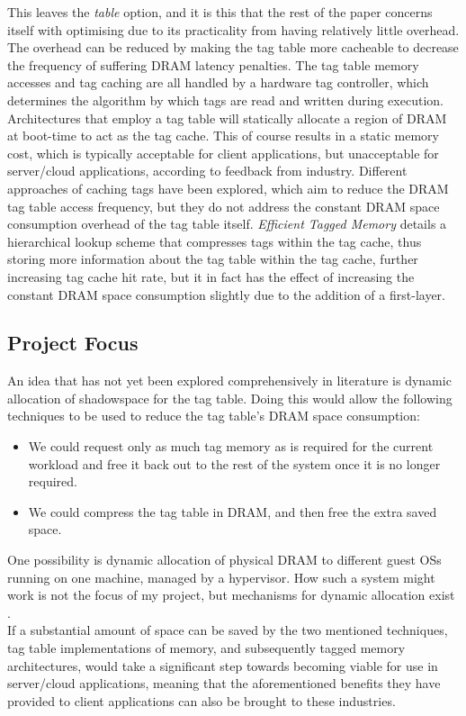 \documentclass[10pt,a4paper]{article}
\begin{document}
This leaves the \textit{table} option, and it is this that the rest of the paper concerns itself with optimising due to its practicality from having relatively little overhead. The overhead can be reduced by making the tag table more cacheable to decrease the frequency of suffering DRAM latency penalties. The tag table memory accesses and tag caching are all handled by a hardware tag controller, which determines the algorithm by which tags are read and written during execution.\\
Architectures that employ a tag table will statically allocate a region of DRAM at boot-time to act as the tag cache. This of course results in a static memory cost, which is typically acceptable for client applications, but unacceptable for server/cloud applications, according to feedback from industry. Different approaches of caching tags have been explored, which aim to reduce the DRAM tag table access frequency, but they do not address the constant DRAM space consumption overhead of the tag table itself. \textit{Efficient Tagged Memory} details a hierarchical lookup scheme that compresses tags within the tag cache, thus storing more information about the tag table within the tag cache, further increasing tag cache hit rate, but it in fact has the effect of increasing the constant DRAM space consumption slightly due to the addition of a first-layer.\\

\subsection*{Project Focus}
An idea that has not yet been explored comprehensively in literature is dynamic allocation of shadowspace for the tag table. Doing this would allow the following techniques to be used to reduce the tag table's DRAM space consumption:
\begin{itemize}
\item We could request only as much tag memory as is required for the current workload and free it back out to the rest of the system once it is no longer required.
\item We could compress the tag table in DRAM, and then free the extra saved space.
\end{itemize}
One possibility is dynamic allocation of physical DRAM to different guest OSs running on one machine, managed by a hypervisor. How such a system might work is not the focus of my project, but mechanisms for dynamic allocation exist \cite{hypervdynamicmemory}.\\
If a substantial amount of space can be saved by the two mentioned techniques, tag table implementations of memory, and subsequently tagged memory architectures, would take a significant step towards becoming viable for use in server/cloud applications, meaning that the aforementioned benefits they have provided to client applications can also be brought to these industries.
\end{document}
